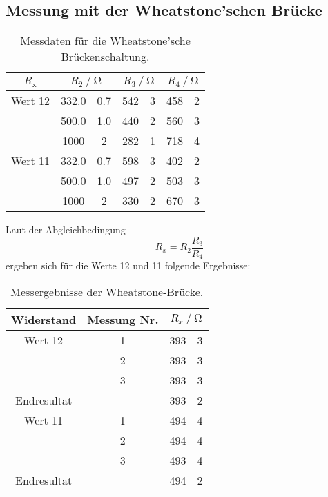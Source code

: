 \subsection{Messung mit der Wheatstone'schen Brücke}
\FloatBarrier
    \begin{table}
        \centering
        \caption{Messdaten für die Wheatstone'sche Brückenschaltung.}
        \label{tab:wheat}
        \begin{tabular}{c S[table-format=4.1] @{${}\pm{}$} S[table-format=1.1] S[table-format=3.0] @{${}\pm{}$} S[table-format=1.0] S[table-format=3.0] @{${}\pm{}$} S[table-format=1.0]}
            \toprule
            {$R_\text{x}$} &  &  &  \\
            \midrule
            Wert 12 & 332.0 & 0.7   & 542 & 3 & 458 & 2 \\
                    & 500.0 & 1.0   & 440 & 2 & 560 & 3 \\
                    & 1000  & 2     & 282 & 1 & 718 & 4 \\
            Wert 11 & 332.0 & 0.7   & 598 & 3 & 402 & 2 \\
                    & 500.0 & 1.0   & 497 & 2 & 503 & 3 \\
                    & 1000  & 2     & 330 & 2 & 670 & 3 \\
            \bottomrule
        \end{tabular}
    \end{table}
    Laut der Abgleichbedingung
    \begin{equation}
        R_x = R_2 \frac{R_3}{R_4}
    \end{equation}
    ergeben sich für die Werte 12 und 11 folgende Ergebnisse:
    \begin{table}
        \centering
        \caption{Messergebnisse der Wheatstone-Brücke.}
        \label{tab:resultwheat}
        \begin{tabular}{c c S[table-format=3.0] @{${}\pm{}$} S[table-format=1.0]}
            \toprule
            {Widerstand} & {Messung Nr.} &  \\
            \midrule
            Wert 12 & 1 & 393 & 3 \\
                    & 2 & 393 & 3 \\
                    & 3 & 393 & 3 \\
            Endresultat&   & 393 & 2 \\
            Wert 11 & 1 & 494 & 4 \\
                    & 2 & 494 & 4 \\
                    & 3 & 493 & 4 \\
            Endresultat&   & 494 & 2 \\
            \bottomrule
        \end{tabular}
    \end{table}
\FloatBarrier

